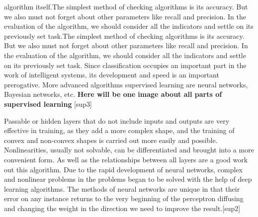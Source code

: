 algorithm itself.The simplest method of checking algorithms is its accuracy. But we also must not forget about other parameters like recall and precision. In the evaluation of the algorithm, we should consider all the indicators and settle on its previously set task.The simplest method of checking algorithms is its accuracy. But we also must not forget about other parameters like recall and precision. In the evaluation of the algorithm, we should consider all the indicators and settle on its previously set task. Since classification occupies an important part in the work of intelligent systems, its development and speed is an important prerogative. More advanced algorithms supervised learning are neural networks, Bayesian networks, etc. \textbf{Here will be one image about all parts of supervised learning} [sup3]


\vspace{-0.5cm}
\noindent Passable or hidden layers that do not include inputs and outputs are very effective in training, as they add a more complex shape, and the training of convex and non-convex shapes is carried out more easily and possible. Nonlinearities, usually not solvable, can be differentiated and brought into a more convenient form. As well as the relationships between all layers are a good work out this algorithm. Due to the rapid development of neural networks, complex and nonlinear problems in the problems began to be solved with the help of deep learning algorithms. The methods of neural networks are unique in that their error on any instance returns to the very beginning of the perceptron diffusing and changing the weight in the direction we need to improve the result.[sup2]
\vspace{-0.3cm}





